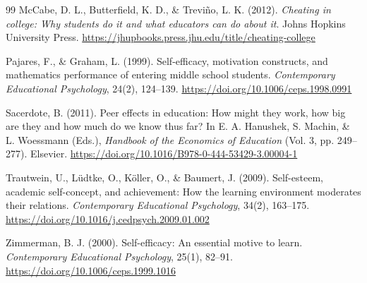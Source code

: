 \documentclass[]{article}
\begin{document}
\begin{thebibliography}{99}
		McCabe, D. L., Butterfield, K. D., \& Treviño, L. K. (2012). \textit{Cheating in college: Why students do it and what educators can do about it}. Johns Hopkins University Press. \href{https://jhupbooks.press.jhu.edu/title/cheating-college}{https://jhupbooks.press.jhu.edu/title/cheating-college}
		
		Pajares, F., \& Graham, L. (1999). Self-efficacy, motivation constructs, and mathematics performance of entering middle school students. \textit{Contemporary Educational Psychology}, 24(2), 124--139. \href{https://doi.org/10.1006/ceps.1998.0991}{https://doi.org/10.1006/ceps.1998.0991}
		
		Sacerdote, B. (2011). Peer effects in education: How might they work, how big are they and how much do we know thus far? In E. A. Hanushek, S. Machin, \& L. Woessmann (Eds.), \textit{Handbook of the Economics of Education} (Vol. 3, pp. 249--277). Elsevier. \href{https://doi.org/10.1016/B978-0-444-53429-3.00004-1}{https://doi.org/10.1016/B978-0-444-53429-3.00004-1}
		
		Trautwein, U., Lüdtke, O., Köller, O., \& Baumert, J. (2009). Self-esteem, academic self-concept, and achievement: How the learning environment moderates their relations. \textit{Contemporary Educational Psychology}, 34(2), 163--175. \href{https://doi.org/10.1016/j.cedpsych.2009.01.002}{https://doi.org/10.1016/j.cedpsych.2009.01.002}
		
		Zimmerman, B. J. (2000). Self-efficacy: An essential motive to learn. \textit{Contemporary Educational Psychology}, 25(1), 82--91. \href{https://doi.org/10.1006/ceps.1999.1016}{https://doi.org/10.1006/ceps.1999.1016}
		
	\end{thebibliography}
	
	
	
\end{document}
